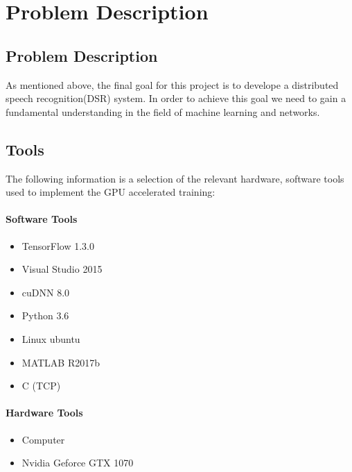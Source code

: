 \chapter{Problem Description}\label{ch:problem_description}

\section{Problem Description}

As mentioned above, the final goal for this project is to develope a distributed
speech recognition(DSR) system.
In order to achieve this goal we need to gain a fundamental understanding in the field of machine learning and networks.

\section{Tools}
The following information is a selection of the relevant hardware, software tools used to implement the GPU accelerated training:

\subsubsection{Software Tools}
\begin{itemize}
	\item TensorFlow 1.3.0
	\item Visual Studio 2015
	\item cuDNN 8.0
	\item Python 3.6
	\item Linux ubuntu
	\item MATLAB  R2017b
	\item C (TCP)
\end{itemize}

\subsubsection{Hardware Tools}
\begin{itemize}
	\item Computer
	\item Nvidia Geforce GTX 1070 
\end{itemize}




